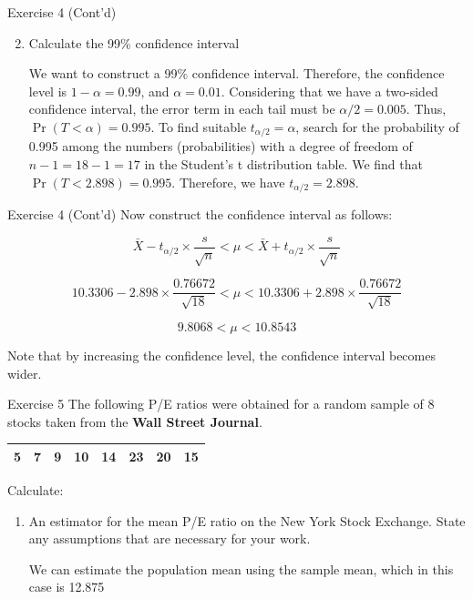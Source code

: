 \documentclass[
  ignorenonframetext,
  aspectratio=43,
]{beamer}
\let\olditem\item
\renewcommand\item{\olditem\justifying}
\begin{document}
\begin{frame}{Exercise 4 (Cont'd)}
\protect\hypertarget{exercise-4-contd-3}{}
\begin{enumerate}
\setcounter{enumi}{1}
\item
  Calculate the 99\% confidence interval

  \pause

  We want to construct a 99\% confidence interval. Therefore, the
  confidence level is \(1-\alpha = 0.99\), and \(\alpha = 0.01\).
  Considering that we have a two-sided confidence interval, the error
  term in each tail must be \(\alpha/2 = 0.005\). Thus,
  \(\Pr(T < \alpha) = 0.995\). To find suitable
  \(t_{\alpha/2} = \alpha\), search for the probability of 0.995 among
  the numbers (probabilities) with a degree of freedom of
  \(n-1 = 18-1 = 17\) in the Student's t distribution table. We find
  that \(\Pr(T < 2.898) = 0.995\). Therefore, we have
  \(t_{\alpha/2} = 2.898\).
\end{enumerate}
\end{frame}

\begin{frame}{Exercise 4 (Cont'd)}
\protect\hypertarget{exercise-4-contd-4}{}
Now construct the confidence interval as follows:

\pause

\[
\bar{X} - t_{\alpha/2} \times \frac{s}{\sqrt{n}} < \mu < \bar{X} + t_{\alpha/2} \times \frac{s}{\sqrt{n}}
\]

\pause

\[
10.3306 - 2.898 \times \frac{0.76672}{\sqrt{18}} < \mu < 10.3306 + 2.898 \times \frac{0.76672}{\sqrt{18}}
\]

\pause

\[
9.8068 < \mu < 10.8543
\]

Note that by increasing the confidence level, the confidence interval
becomes wider.
\end{frame}

\begin{frame}{Exercise 5}
\protect\hypertarget{exercise-5}{}
The following P/E ratios were obtained for a random sample of 8 stocks
taken from the \textbf{Wall Street Journal}.

\bigskip
\begin{table}[h!]
\centering
\begin{tabular}{cccccccc}
\toprule
5 & 7 & 9 & 10 & 14 & 23 & 20 & 15 \\
\bottomrule
\end{tabular}
\end{table}
\bigskip

Calculate:

\begin{enumerate}
\item
  An estimator for the mean P/E ratio on the New York Stock Exchange.
  State any assumptions that are necessary for your work.

  \pause

  We can estimate the population mean using the sample mean, which in
  this case is 12.875
\end{enumerate}
\end{frame}
\end{document}
